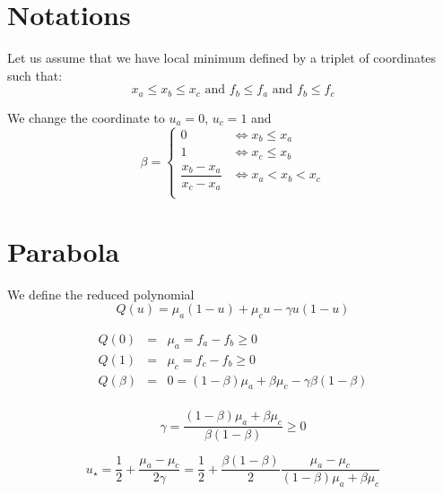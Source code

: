 \documentclass[aps,12pt]{revtex4}
\begin{document}
\section{Notations}
Let us assume that we have local minimum defined by a triplet of coordinates such that:
\begin{equation}
	x_a \leq x_b \leq x_c \text{ and } f_b \leq f_a \text{ and } f_b \leq f_c
\end{equation}

We change the coordinate to $u_a=0$, $u_c=1$ and
\begin{equation}
	\beta = \left\lbrace
	\begin{array}{cc}
	0 & \iff  x_b\leq x_a\\
	1 & \iff  x_c\leq x_b\\
	\dfrac{x_b-x_a}{x_c-x_a} & \iff x_a < x_b < x_c\\
	\end{array}
	\right.
\end{equation}

\section{Parabola}
We define the reduced polynomial
\begin{equation}
	Q(u) =  \mu_a (1-u) + \mu_c u - \gamma u(1-u)
\end{equation}	 
 
\begin{equation}
\begin{array}{rcl}
	Q(0) & = & \mu_a = f_a - f_b \geq 0\\
	Q(1) & = & \mu_c = f_c - f_b \geq 0\\
	Q(\beta) & = & 0 = (1-\beta)\mu_a + \beta \mu_c - \gamma \beta(1-\beta)\\
\end{array}
\end{equation}	

\begin{equation}
	\gamma = \dfrac{(1-\beta)\mu_a + \beta \mu_c}{\beta(1-\beta)}  \geq 0 
\end{equation}

\begin{equation}
\boxed{
	u_\star = \dfrac{1}{2} + \dfrac{\mu_a-\mu_c}{2\gamma} = \dfrac{1}{2} + \dfrac{\beta(1-\beta)}{2} 
	\dfrac{\mu_a-\mu_c}{(1-\beta)\mu_a + \beta \mu_c}
	}
\end{equation}
\end{document}
